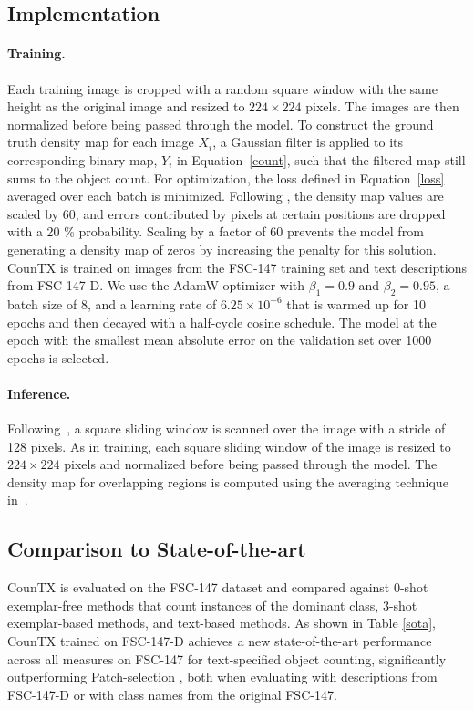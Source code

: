 \documentclass{bmvc2k}
\begin{document}
\subsection{Implementation}
\paragraph{Training.} Each training image is cropped with a random square window with the same height as the original image and resized to $224 \times 224$ pixels. The images are then normalized before being passed through the model. To construct the ground truth density map for each image $X_{i}$, a Gaussian filter is applied to its corresponding binary map, $Y_{i}$ in Equation~\ref{count}, such that the filtered map still sums to the object count. For optimization, the loss defined in Equation~\ref{loss} averaged over each batch is minimized. Following \cite{Liu2022CounTRTG}, the density map values are scaled by 60, and errors contributed by pixels at certain positions are dropped with a 20 \% probability. Scaling by a factor of 60 prevents the model from generating a density map of zeros by increasing the penalty for this solution. CounTX is trained on images from the FSC-147 training set and text descriptions from FSC-147-D. We use the AdamW optimizer with $\beta_{1} = 0.9$ and $\beta_{2} = 0.95$, a batch size of 8, and a learning rate of $6.25 \times 10^{-6}$ that is warmed up for 10 epochs and then decayed with a half-cycle cosine schedule. The model at the epoch with the smallest mean absolute error on the validation set over 1000 epochs is selected.

\paragraph{Inference.} Following~\cite{Liu2022CounTRTG}, a square sliding window is scanned over the image with a stride of 128 pixels. As in training, each square sliding window of the image is resized to $224 \times 224$ pixels and normalized before being passed through the model. The density map for overlapping regions is computed using the averaging technique in~\cite{Liu2022CounTRTG}. 

\subsection{Comparison to State-of-the-art}
CounTX is evaluated on the FSC-147 dataset and compared against 0-shot exemplar-free methods that count instances of the dominant class, 3-shot exemplar-based methods, and text-based methods. As shown in Table \ref{sota}, CounTX trained on FSC-147-D achieves a new state-of-the-art performance across all measures on FSC-147 for text-specified object counting, significantly outperforming Patch-selection \cite{Xu2023ZeroshotOC}, both when evaluating with descriptions from FSC-147-D or with class names from the original FSC-147.
\end{document}
